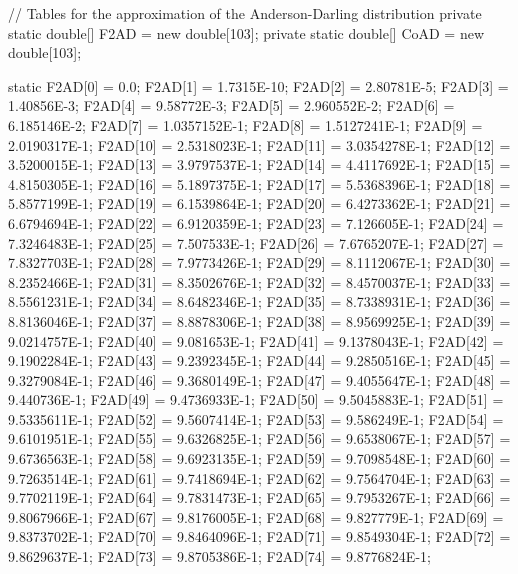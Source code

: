 \begin{code}\begin{hide}
   // Tables for the approximation of the Anderson-Darling distribution
   private static double[] F2AD = new double[103];
   private static double[] CoAD = new double[103];

   static {
      F2AD[0] = 0.0;
      F2AD[1] = 1.7315E-10;
      F2AD[2] = 2.80781E-5;
      F2AD[3] = 1.40856E-3;
      F2AD[4] = 9.58772E-3;
      F2AD[5] = 2.960552E-2;
      F2AD[6] = 6.185146E-2;
      F2AD[7] = 1.0357152E-1;
      F2AD[8] = 1.5127241E-1;
      F2AD[9] = 2.0190317E-1;
      F2AD[10] = 2.5318023E-1;
      F2AD[11] = 3.0354278E-1;
      F2AD[12] = 3.5200015E-1;
      F2AD[13] = 3.9797537E-1;
      F2AD[14] = 4.4117692E-1;
      F2AD[15] = 4.8150305E-1;
      F2AD[16] = 5.1897375E-1;
      F2AD[17] = 5.5368396E-1;
      F2AD[18] = 5.8577199E-1;
      F2AD[19] = 6.1539864E-1;
      F2AD[20] = 6.4273362E-1;
      F2AD[21] = 6.6794694E-1;
      F2AD[22] = 6.9120359E-1;
      F2AD[23] = 7.126605E-1;
      F2AD[24] = 7.3246483E-1;
      F2AD[25] = 7.507533E-1;
      F2AD[26] = 7.6765207E-1;
      F2AD[27] = 7.8327703E-1;
      F2AD[28] = 7.9773426E-1;
      F2AD[29] = 8.1112067E-1;
      F2AD[30] = 8.2352466E-1;
      F2AD[31] = 8.3502676E-1;
      F2AD[32] = 8.4570037E-1;
      F2AD[33] = 8.5561231E-1;
      F2AD[34] = 8.6482346E-1;
      F2AD[35] = 8.7338931E-1;
      F2AD[36] = 8.8136046E-1;
      F2AD[37] = 8.8878306E-1;
      F2AD[38] = 8.9569925E-1;
      F2AD[39] = 9.0214757E-1;
      F2AD[40] = 9.081653E-1;
      F2AD[41] = 9.1378043E-1;
      F2AD[42] = 9.1902284E-1;
      F2AD[43] = 9.2392345E-1;
      F2AD[44] = 9.2850516E-1;
      F2AD[45] = 9.3279084E-1;
      F2AD[46] = 9.3680149E-1;
      F2AD[47] = 9.4055647E-1;
      F2AD[48] = 9.440736E-1;
      F2AD[49] = 9.4736933E-1;
      F2AD[50] = 9.5045883E-1;
      F2AD[51] = 9.5335611E-1;
      F2AD[52] = 9.5607414E-1;
      F2AD[53] = 9.586249E-1;
      F2AD[54] = 9.6101951E-1;
      F2AD[55] = 9.6326825E-1;
      F2AD[56] = 9.6538067E-1;
      F2AD[57] = 9.6736563E-1;
      F2AD[58] = 9.6923135E-1;
      F2AD[59] = 9.7098548E-1;
      F2AD[60] = 9.7263514E-1;
      F2AD[61] = 9.7418694E-1;
      F2AD[62] = 9.7564704E-1;
      F2AD[63] = 9.7702119E-1;
      F2AD[64] = 9.7831473E-1;
      F2AD[65] = 9.7953267E-1;
      F2AD[66] = 9.8067966E-1;
      F2AD[67] = 9.8176005E-1;
      F2AD[68] = 9.827779E-1;
      F2AD[69] = 9.8373702E-1;
      F2AD[70] = 9.8464096E-1;
      F2AD[71] = 9.8549304E-1;
      F2AD[72] = 9.8629637E-1;
      F2AD[73] = 9.8705386E-1;
      F2AD[74] = 9.8776824E-1;
}
\end{hide}
\end{code}
